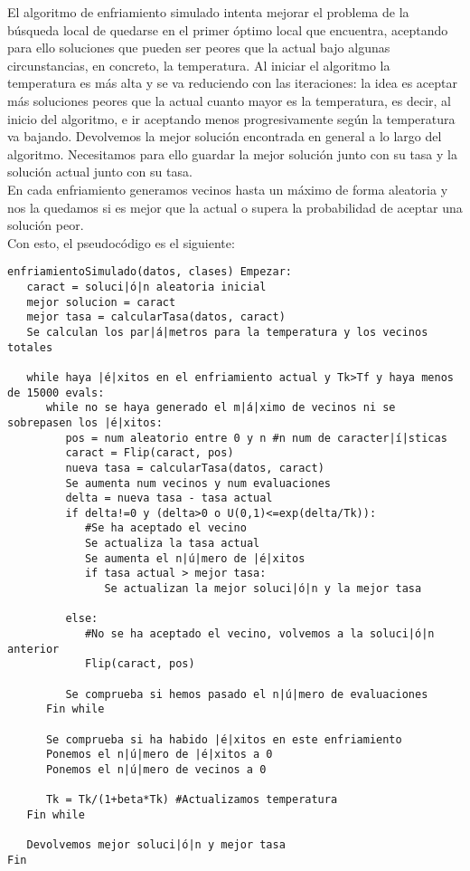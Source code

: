 \documentclass[12pt]{article}
\begin{document}
El algoritmo de enfriamiento simulado intenta mejorar el problema de la búsqueda local de quedarse en el primer óptimo local que encuentra, aceptando para ello soluciones que pueden ser peores que la actual bajo algunas circunstancias, en concreto, la temperatura. Al iniciar el algoritmo la temperatura es más alta y se va reduciendo con las iteraciones: la idea es aceptar más soluciones peores que la actual cuanto mayor es la temperatura, es decir, al inicio del algoritmo, e ir aceptando menos progresivamente según la temperatura va bajando. Devolvemos la mejor solución encontrada en general a lo largo del algoritmo. Necesitamos para ello guardar la mejor solución junto con su tasa y la solución actual junto con su tasa.\\
En cada enfriamiento generamos vecinos hasta un máximo de forma aleatoria y nos la quedamos si es mejor que la actual o supera la probabilidad de aceptar una solución peor.\\

Con esto, el pseudocódigo es el siguiente:
\begin{lstlisting}
enfriamientoSimulado(datos, clases) Empezar:
   caract = soluci|ó|n aleatoria inicial
   mejor solucion = caract
   mejor tasa = calcularTasa(datos, caract)
   Se calculan los par|á|metros para la temperatura y los vecinos totales

   while haya |é|xitos en el enfriamiento actual y Tk>Tf y haya menos de 15000 evals:
      while no se haya generado el m|á|ximo de vecinos ni se sobrepasen los |é|xitos:
         pos = num aleatorio entre 0 y n #n num de caracter|í|sticas
         caract = Flip(caract, pos)
         nueva tasa = calcularTasa(datos, caract)
         Se aumenta num vecinos y num evaluaciones
         delta = nueva tasa - tasa actual
         if delta!=0 y (delta>0 o U(0,1)<=exp(delta/Tk)):
            #Se ha aceptado el vecino
            Se actualiza la tasa actual
            Se aumenta el n|ú|mero de |é|xitos
            if tasa actual > mejor tasa:
               Se actualizan la mejor soluci|ó|n y la mejor tasa
      
         else:
            #No se ha aceptado el vecino, volvemos a la soluci|ó|n anterior
            Flip(caract, pos)
         
         Se comprueba si hemos pasado el n|ú|mero de evaluaciones
      Fin while
   
      Se comprueba si ha habido |é|xitos en este enfriamiento
      Ponemos el n|ú|mero de |é|xitos a 0
      Ponemos el n|ú|mero de vecinos a 0
      
      Tk = Tk/(1+beta*Tk) #Actualizamos temperatura
   Fin while
      
   Devolvemos mejor soluci|ó|n y mejor tasa
Fin
\end{lstlisting}
\end{document}
